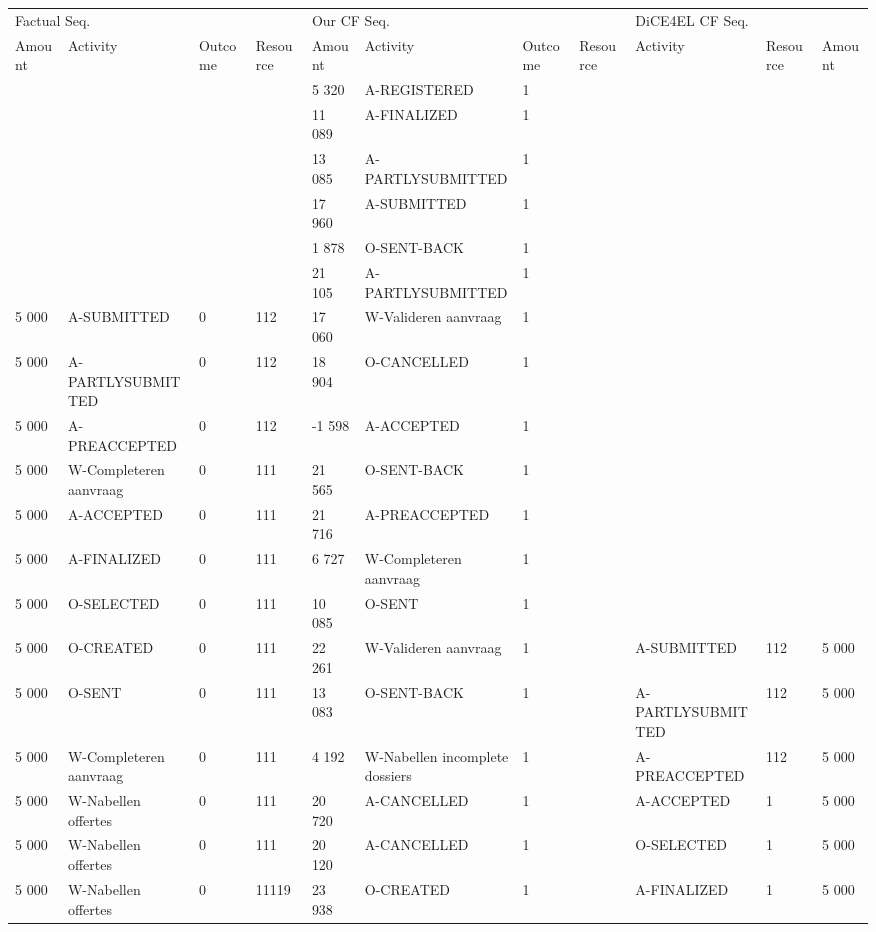 \begin{tabular}{lllllllllll}
\toprule
\multicolumn{4}{l}{Factual Seq.} & \multicolumn{4}{l}{Our CF Seq.} & \multicolumn{3}{l}{DiCE4EL CF Seq.} \\
Amount & Activity & Outcome & Resource & Amount & Activity & Outcome & Resource & Activity & Resource & Amount \\
\midrule
 &  &  &  & 5 320 & A-REGISTERED & 1 &  &  &  &  \\
 &  &  &  & 11 089 & A-FINALIZED & 1 &  &  &  &  \\
 &  &  &  & 13 085 & A-PARTLYSUBMITTED & 1 &  &  &  &  \\
 &  &  &  & 17 960 & A-SUBMITTED & 1 &  &  &  &  \\
 &  &  &  & 1 878 & O-SENT-BACK & 1 &  &  &  &  \\
 &  &  &  & 21 105 & A-PARTLYSUBMITTED & 1 &  &  &  &  \\
5 000 & A-SUBMITTED & 0 & 112 & 17 060 & W-Valideren aanvraag & 1 &  &  &  &  \\
5 000 & A-PARTLYSUBMITTED & 0 & 112 & 18 904 & O-CANCELLED & 1 &  &  &  &  \\
5 000 & A-PREACCEPTED & 0 & 112 & -1 598 & A-ACCEPTED & 1 &  &  &  &  \\
5 000 & W-Completeren aanvraag & 0 & 111 & 21 565 & O-SENT-BACK & 1 &  &  &  &  \\
5 000 & A-ACCEPTED & 0 & 111 & 21 716 & A-PREACCEPTED & 1 &  &  &  &  \\
5 000 & A-FINALIZED & 0 & 111 & 6 727 & W-Completeren aanvraag & 1 &  &  &  &  \\
5 000 & O-SELECTED & 0 & 111 & 10 085 & O-SENT & 1 &  &  &  &  \\
5 000 & O-CREATED & 0 & 111 & 22 261 & W-Valideren aanvraag & 1 &  & A-SUBMITTED & 112 & 5 000 \\
5 000 & O-SENT & 0 & 111 & 13 083 & O-SENT-BACK & 1 &  & A-PARTLYSUBMITTED & 112 & 5 000 \\
5 000 & W-Completeren aanvraag & 0 & 111 & 4 192 & W-Nabellen incomplete dossiers & 1 &  & A-PREACCEPTED & 112 & 5 000 \\
5 000 & W-Nabellen offertes & 0 & 111 & 20 720 & A-CANCELLED & 1 &  & A-ACCEPTED & 1 & 5 000 \\
5 000 & W-Nabellen offertes & 0 & 111 & 20 120 & A-CANCELLED & 1 &  & O-SELECTED & 1 & 5 000 \\
5 000 & W-Nabellen offertes & 0 & 11119 & 23 938 & O-CREATED & 1 &  & A-FINALIZED & 1 & 5 000 \\

\end{tabular}

